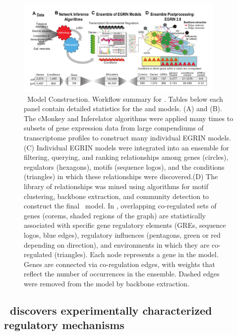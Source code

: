 \begin{figure}[h!]
    \centering
    \includegraphics[width=0.9\textwidth]{figures/egrin2_fig1}
 	\caption[\egrine~Model Construction.]{\egrine~Model Construction. Workflow summary for \egrine. Tables below each panel contain detailed statistics for the \halo and \eco models. (A) and (B). The cMonkey and Inferelator algorithms were applied many times to subsets of gene expression data from large compendiums of transcriptome profiles to construct many individual EGRIN models.(C) Individual EGRIN models were integrated into an ensemble for filtering, querying, and ranking relationships among genes (circles), regulators (hexagons), motifs (sequence logos), and the conditions (triangles) in which these relationships were discovered.(D) The library of relationships was mined using algorithms for motif clustering, backbone extraction, and community detection to construct the final \egrine~model. In \egrine, overlapping co-regulated sets of genes (corems, shaded regions of the graph) are statistically associated with specific gene regulatory elements (GREs, sequence logos, blue edges), regulatory influences (pentagons, green or red depending on direction), and environments in which they are co-regulated (triangles). Each node represents a gene in the model. Genes are connected via co-regulation edges, with weights that reflect the number of occurrences in the ensemble. Dashed edges were removed from the model by backbone extraction.}
    \label{fig:egrin2:1}
\end{figure}

\subsection{\egrine~discovers experimentally characterized regulatory mechanisms}

